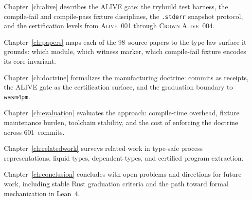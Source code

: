 Chapter~\ref{ch:alive} describes the ALIVE gate: the trybuild test harness,
the compile-fail and compile-pass fixture disciplines, the \texttt{.stderr}
snapshot protocol, and the certification levels from
\textsc{Alive~001} through \textsc{Crown Alive~004}.

Chapter~\ref{ch:papers} maps each of the 98~source papers to the type-law
surface it grounds: which module, which witness marker, which compile-fail
fixture encodes its core invariant.

Chapter~\ref{ch:doctrine} formalizes the manufacturing doctrine: commits as
receipts, the ALIVE gate as the certification surface, and the graduation
boundary to \texttt{wasm4pm}.

Chapter~\ref{ch:evaluation} evaluates the approach: compile-time overhead,
fixture maintenance burden, toolchain stability, and the cost of enforcing
the doctrine across 601~commits.

Chapter~\ref{ch:relatedwork} surveys related work in type-safe process
representations, liquid types, dependent types, and certified program
extraction.

Chapter~\ref{ch:conclusion} concludes with open problems and directions for
future work, including stable Rust graduation criteria and the path toward
formal mechanization in Lean~4.
